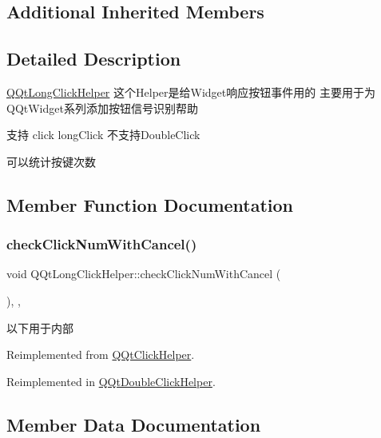 \subsection*{Additional Inherited Members}


\subsection{Detailed Description}
\mbox{\hyperlink{class_q_qt_long_click_helper}{Q\+Qt\+Long\+Click\+Helper}} 这个\+Helper是给\+Widget响应按钮事件用的 主要用于为\+Q\+Qt\+Widget系列添加按钮信号识别帮助

支持 click long\+Click 不支持\+Double\+Click

可以统计按键次数 

\subsection{Member Function Documentation}
\mbox{\label{class_q_qt_long_click_helper_a9cc68a8b81d6ffe142509cdb31db78b1}} 
\subsubsection{\texorpdfstring{check\+Click\+Num\+With\+Cancel()}{checkClickNumWithCancel()}}
{\footnotesize\ttfamily void Q\+Qt\+Long\+Click\+Helper\+::check\+Click\+Num\+With\+Cancel (\begin{DoxyParamCaption}{ }\end{DoxyParamCaption})\hspace{0.3cm}{\ttfamily [override]}, {\ttfamily [protected]}, {\ttfamily [virtual]}}

以下用于内部 

Reimplemented from \mbox{\hyperlink{class_q_qt_click_helper_ac66c7a5eccddec8d34fc74afd6a266f7}{Q\+Qt\+Click\+Helper}}.



Reimplemented in \mbox{\hyperlink{class_q_qt_double_click_helper_a42ab28dcfaf01d7e8bf8bb01bd5ca311}{Q\+Qt\+Double\+Click\+Helper}}.



\subsection{Member Data Documentation}
\mbox{\label{class_q_qt_long_click_helper_aae392691a102b1b7de765494bc5e6946}} 
